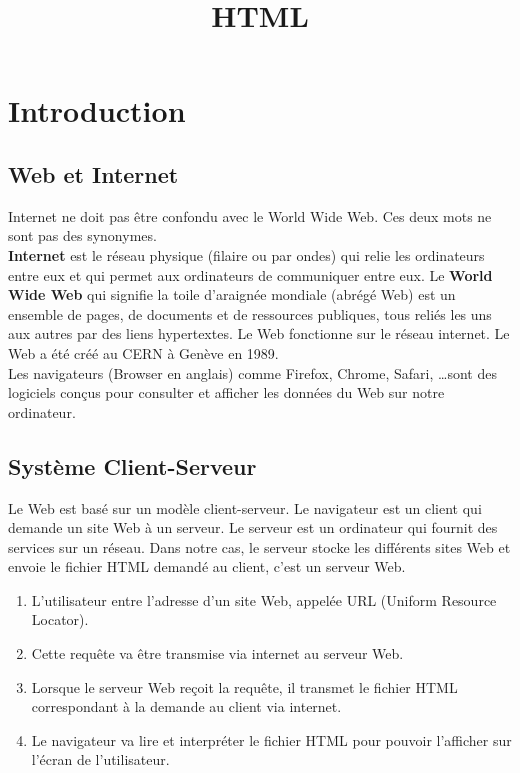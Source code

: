 \documentclass[a4paper,11pt]{article}
\begin{document}
\title{HTML}
\date{}
\maketitle

\section{Introduction}
\subsection{Web et Internet}
Internet ne doit pas être confondu avec le World Wide Web. Ces deux mots ne sont pas des synonymes.\\
\textbf{Internet} est le réseau physique (filaire ou par ondes) qui relie les ordinateurs entre eux et qui permet aux ordinateurs de communiquer entre eux.
Le \textbf{World Wide Web} qui signifie la toile d'araignée mondiale (abrégé Web) est un ensemble de pages, de documents et de ressources publiques, tous reliés les uns aux autres par des liens hypertextes. Le Web fonctionne sur le réseau internet. Le Web a été créé au CERN à Genève en 1989.\\
Les navigateurs (Browser en anglais) comme Firefox, Chrome, Safari, \dots sont des logiciels conçus pour consulter et afficher les données du Web sur notre ordinateur.

\subsection{Système Client-Serveur}
Le Web est basé sur un modèle client-serveur. Le navigateur est un client qui demande un site Web à un serveur. Le serveur est un ordinateur qui fournit des services sur un réseau. Dans notre cas, le serveur stocke les différents sites Web et envoie le fichier HTML demandé au client, c'est un serveur Web.
\begin{enumerate}[label=\arabic*)]
\item L'utilisateur entre l'adresse d'un site Web, appelée URL (Uniform Resource Locator).
\item Cette requête va être transmise via internet au serveur Web.
\item Lorsque le serveur Web reçoit la requête, il transmet le fichier HTML correspondant à la demande au client via internet.
\item Le navigateur va lire et interpréter le fichier HTML pour pouvoir l'afficher sur l'écran de l'utilisateur.
\end{enumerate}
\end{document}
